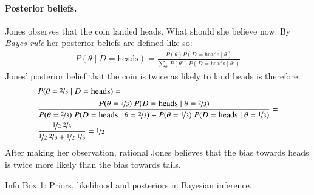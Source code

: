 \documentclass[nobib]{tufte-handout}
\begin{document}
\begin{InfoBox}[t]
{\begin{minipage}{1.0\textwidth}
    \paragraph{Posterior beliefs.} Jones observes that the coin landed heads. What should she
    believe now. By \emph{Bayes rule} her posterior beliefs are defined like so:
    \begin{align*}
      P(\theta \mid D = \text{heads}) = \frac{P(\theta) P(D = \text{heads} \mid \theta)}{\sum_{\theta'}P(\theta') P(D = \text{heads} \mid \theta')}
    \end{align*}
    Jones' posterior belief that the coin is twice as likely to land heads is therefore:
    \begin{align*}
      & P(\theta = \nicefrac{2}{3} \mid D = \text{heads}) =  \\
      & \frac{P(\theta = \nicefrac{2}{3}) \ P(D = \text{heads} \mid \theta = \nicefrac{2}{3})}{P(\theta = \nicefrac{2}{3}) \ P(D = \text{heads} \mid \theta = \nicefrac{2}{3}) + P(\theta = \nicefrac{1}{3}) \ P(D = \text{heads} \mid \theta = \nicefrac{1}{3})} = \\
      & \frac{\nicefrac{1}{2} \ \nicefrac{2}{3}}{\nicefrac{1}{2} \ \nicefrac{2}{3} + \nicefrac{1}{2} \ \nicefrac{1}{3}} = \nicefrac{1}{2}
    \end{align*}
    After making her observation, rational Jones believes that the bias towards heads is twice
    more likely than the bias towards tails.
    
  \end{minipage} \par
  } \par
  \begin{center}
    Info Box 1: Priors, likelihood and posteriors in Bayesian inference.
  \end{center}
\end{InfoBox}



\end{document}
